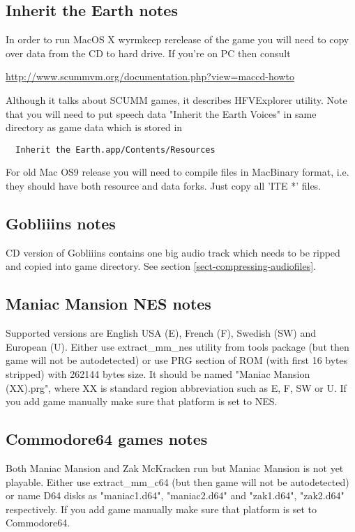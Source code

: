 \subsection{Inherit the Earth notes}
In order to run MacOS X wyrmkeep rerelease of the game you will need to copy
over data from the CD to hard drive. If you're on PC then consult

\url{http://www.scummvm.org/documentation.php?view=maccd-howto}

Although it talks about SCUMM games, it describes HFVExplorer utility. Note
that you will need to put speech data "Inherit the Earth Voices" in same
directory as game data which is stored in

\begin{verbatim}
  Inherit the Earth.app/Contents/Resources
\end{verbatim}

For old Mac OS9 release you will need to compile files in MacBinary format,
i.e. they should have both resource and data forks. Just copy all 'ITE *' files.


\subsection{Gobliiins notes}
CD version of Gobliiins contains one big audio track which needs to be ripped
and copied into game directory. See section \ref{sect-compressing-audiofiles}.

\subsection{Maniac Mansion NES notes}
Supported versions are English USA (E), French (F), Swedish (SW) and European
(U). Either use extract\_mm\_nes utility from tools package (but then game
will not be autodetected) or use PRG section of ROM (with first 16 bytes
stripped) with 262144 bytes size. It should be named "Maniac Mansion (XX).prg",
where XX is standard region abbreviation such as E, F, SW or U. If you add
game manually make sure that platform is set to NES.

\subsection{Commodore64 games notes}
Both Maniac Mansion and Zak McKracken run but Maniac Mansion is not yet
playable. Either use extract\_mm\_c64 (but then game will not be autodetected)
or name D64 disks as "maniac1.d64", "maniac2.d64" and "zak1.d64", "zak2.d64"
respectively. If you add game manually make sure that platform is set to
Commodore64.
